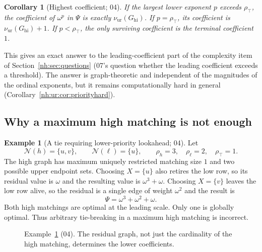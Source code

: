 \documentclass[11pt,a4paper]{article}
\newtheorem{corollary}[theorem]{Corollary}
\theoremstyle{definition}
\newtheorem{example}[theorem]{Example}
\theoremstyle{remark}
\newcommand{\Nb}{\mathcal N}
\newcommand{\nuur}{\nu_{\mathrm{ur}}}
\newcommand{\rtop}{\rho_{\top}}
\begin{document}
\begin{corollary}[Highest coefficient; 04]\label{nh:ur:cor:leading}
If the largest lower exponent $p$ exceeds $\rtop$, the coefficient of
$\omega^p$ in $\Psi$ is exactly $\nuur(G_{\mathrm{hi}})$. If $p=\rtop$, its
coefficient is $\nuur(G_{\mathrm{hi}})+1$. If $p<\rtop$, the only surviving
coefficient is the terminal coefficient $1$.
\end{corollary}
This gives an exact answer to the leading-coefficient part of the complexity
item of Section~\ref{nh:sec:questions} (07's question whether the leading
coefficient exceeds a threshold). The answer is graph-theoretic and
independent of the magnitudes of the ordinal exponents, but it remains
computationally hard in general (Corollary~\ref{nh:ur:cor:priorityhard}).

\subsection{Why a maximum high matching is not enough}
\begin{example}[A tie requiring lower-priority lookahead; 04]\label{nh:ur:ex:tie}
Let
\[
 \Nb(h)=\{u,v\},\qquad \Nb(\ell)=\{u\},\qquad
 \rho_h=3,\quad\rho_\ell=2,\quad\rtop=1.
\]
The high graph has maximum uniquely restricted matching size $1$ and two
possible upper endpoint sets. Choosing $X=\{u\}$ also retires the low row, so
its residual value is $\omega$ and the resulting value is $\omega^3+\omega$.
Choosing $X=\{v\}$ leaves the low row alive, so the residual is a single edge
of weight $\omega^2$ and the result is
\[
 \Psi=\omega^3+\omega^2+\omega.
\]
Both high matchings are optimal at the leading scale. Only one is globally
optimal. Thus arbitrary tie-breaking in a maximum high matching is incorrect.
\end{example}

\begin{figure}[htbp]
\centering
{}
\caption{Example~\ref{nh:ur:ex:tie} (04). The residual graph, not just the
cardinality of the high matching, determines the lower coefficients.}
\label{nh:ur:fig:tie}
\end{figure}
\end{document}
